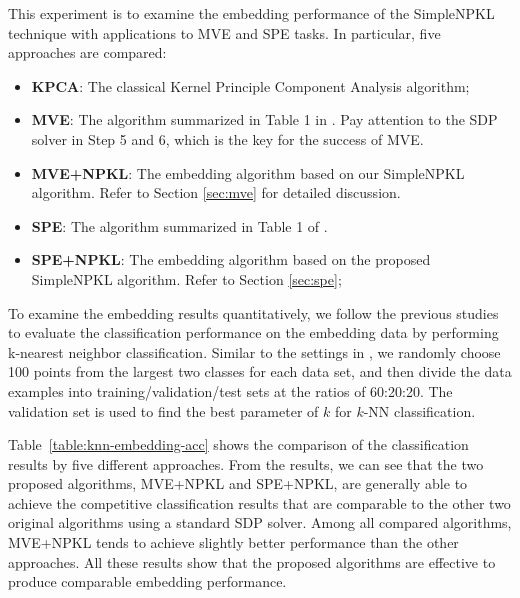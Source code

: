 This experiment is to examine the embedding performance of the SimpleNPKL technique with applications to MVE \cite{aistats/ShawJ07} and SPE \cite{icml/ShawJ09} tasks. In particular, five approaches are compared:%
\begin{itemize}
  \item {\bf KPCA}: The classical Kernel Principle Component Analysis algorithm;\vspace{-0.1in}
  \item {\bf MVE}:  The algorithm summarized in Table 1 in \cite{aistats/ShawJ07}. Pay attention to the SDP solver in Step 5 and 6, which is the key for the success of MVE.  \vspace{-0.1in}
  \item {\bf MVE+NPKL}: The embedding algorithm based on our SimpleNPKL algorithm. Refer to Section \ref{sec:mve} for detailed discussion.\vspace{-0.1in}
  \item {\bf SPE}: The algorithm summarized in Table 1 of \cite{icml/ShawJ09}.   \vspace{-0.1in}
  \item {\bf SPE+NPKL}: The embedding algorithm based on the proposed SimpleNPKL algorithm. Refer to Section \ref{sec:spe};
\end{itemize}
To examine the embedding results quantitatively, we follow the previous studies \cite{aistats/ShawJ07,icml/ShawJ09} to evaluate the classification performance on the embedding data by performing k-nearest neighbor classification. Similar to the settings in \cite{icml/ShawJ09}, we randomly choose 100 points from the largest two classes for each data set, and then divide the data examples into training/validation/test sets at the ratios of 60:20:20. The validation set is used to find the best parameter of $k$ for $k$-NN classification.


Table~\ref{table:knn-embedding-acc} shows the comparison of the classification results by five different approaches. From the results, we can see that the two proposed algorithms, MVE+NPKL and SPE+NPKL, are generally able to achieve the competitive classification results that are comparable to the other two original algorithms using a standard SDP solver. Among all compared algorithms, MVE+NPKL tends to achieve slightly better performance than the other approaches. All these results show that the proposed algorithms are effective to produce comparable embedding performance.


